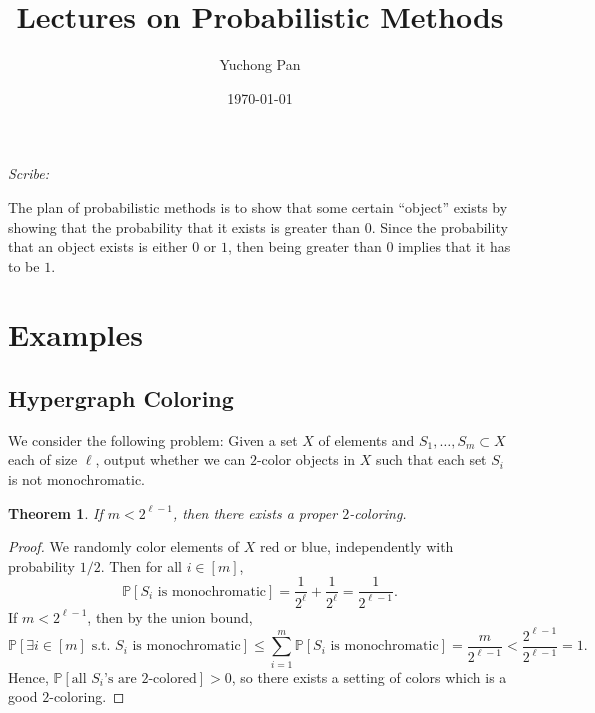 \documentclass[letterpaper, reqno,11pt]{article}
\newcommand{\PP}{\mathbb{P}}
\begin{document}
\title{Lectures on Probabilistic Methods}
\author{Yuchong Pan}
\date{\today}
\newtheorem{theorem}{Theorem}
\newtheorem{lemma}[theorem]{Lemma}
\newtheorem{proposition}[theorem]{Proposition}
\newtheorem{corollary}[theorem]{Corollary}
\newtheorem{fact}[theorem]{Fact}
\newtheorem{claim}{Claim}
\newtheorem{exercise}{Exercise}
\theoremstyle{definition}
\newtheorem{definition}[theorem]{Definition}
%

\begin{framed}
 \hfill \thedate
\begin{center}
\Large{\thetitle}
\end{center}
 \hfill {\em Scribe: \theauthor}
\end{framed}

The plan of probabilistic methods is to show that some certain ``object'' exists by showing that the probability that it exists is greater than $0$. Since the probability that an object exists is either $0$ or $1$, then being greater than $0$ implies that it has to be $1$.

\section{Examples}

\subsection{Hypergraph Coloring}

We consider the following problem: Given a set $X$ of elements and $S_1, \ldots, S_m \subset X$ each of size $\ell$, output whether we can $2$-color objects in $X$ such that each set $S_i$ is not monochromatic.

\begin{theorem}
  If $m < 2^{\ell - 1}$, then there exists a proper $2$-coloring.
\end{theorem}

\begin{proof}
  We randomly color elements of $X$ red or blue, independently with probability $1/2$. Then for all $i \in [m]$,
  $$ \PP\left[\text{$S_i$ is monochromatic}\right] = \frac{1}{2^\ell} + \frac{1}{2^\ell} = \frac{1}{2^{\ell - 1}}. $$
  If $m < 2^{\ell - 1}$, then by the union bound,
  $$ \PP\left[\exists i \in [m] \text{ s.t.\ $S_i$ is monochromatic}\right] \leq \sum_{i = 1}^m \PP\left[\text{$S_i$ is monochromatic}\right] = \frac{m}{2^{\ell - 1}} < \frac{2^{\ell - 1}}{2^{\ell - 1}} = 1. $$
  Hence, $\PP[\text{all $S_i$'s are $2$-colored}] > 0$, so there exists a setting of colors which is a good $2$-coloring.
\end{proof}
\end{document}
